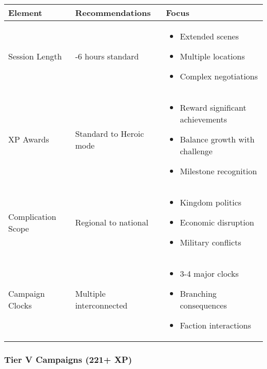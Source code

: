 \documentclass[11pt,letterpaper]{article}
\begin{document}
\begin{longtable}{|>{\raggedright\arraybackslash}p{3cm}|>{\raggedright\arraybackslash}p{4cm}|>{\raggedright\arraybackslash}p{5cm}|}
\hline
\textbf{Element} & \textbf{Recommendations} & \textbf{Focus} \\
\hline
Session Length & 4-6 hours standard & 
\begin{itemize}
    \item Extended scenes
    \item Multiple locations
    \item Complex negotiations
\end{itemize} \\
\hline
XP Awards & Standard to Heroic mode & 
\begin{itemize}
    \item Reward significant achievements
    \item Balance growth with challenge
    \item Milestone recognition
\end{itemize} \\
\hline
Complication Scope & Regional to national & 
\begin{itemize}
    \item Kingdom politics
    \item Economic disruption
    \item Military conflicts
\end{itemize} \\
\hline
Campaign Clocks & Multiple interconnected & 
\begin{itemize}
    \item 3-4 major clocks
    \item Branching consequences
    \item Faction interactions
\end{itemize} \\
\hline
\end{longtable}

\subsubsection{Tier V Campaigns (221+ XP)}
\end{document}
